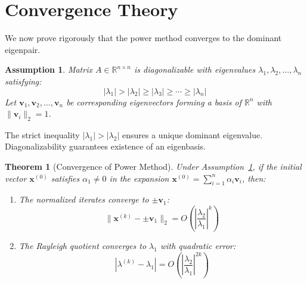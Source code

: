 \documentclass[11pt,a4paper]{article}
\newtheorem{theorem}{Theorem}
\newtheorem{assumption}{Assumption}
\begin{document}
\section{Convergence Theory}

We now prove rigorously that the power method converges to the dominant eigenpair.

\begin{assumption}\label{ass:dominant}
Matrix $A \in \mathbb{R}^{n \times n}$ is diagonalizable with eigenvalues $\lambda_1, \lambda_2, \ldots, \lambda_n$ satisfying:
\begin{equation}
|\lambda_1| > |\lambda_2| \geq |\lambda_3| \geq \cdots \geq |\lambda_n|
\end{equation}
Let $\mathbf{v}_1, \mathbf{v}_2, \ldots, \mathbf{v}_n$ be corresponding eigenvectors forming a basis of $\mathbb{R}^n$ with $\|\mathbf{v}_i\|_2 = 1$.
\end{assumption}

The strict inequality $|\lambda_1| > |\lambda_2|$ ensures a unique dominant eigenvalue. Diagonalizability guarantees existence of an eigenbasis.

\begin{theorem}[Convergence of Power Method]\label{thm:convergence}
Under Assumption~\ref{ass:dominant}, if the initial vector $\mathbf{x}^{(0)}$ satisfies $\alpha_1 \neq 0$ in the expansion $\mathbf{x}^{(0)} = \sum_{i=1}^n \alpha_i \mathbf{v}_i$, then:
\begin{enumerate}
    \item The normalized iterates converge to $\pm\mathbf{v}_1$:
    \begin{equation}
    \|\mathbf{x}^{(k)} - \pm\mathbf{v}_1\|_2 = O\left(\left|\frac{\lambda_2}{\lambda_1}\right|^k\right)
    \end{equation}
    \item The Rayleigh quotient converges to $\lambda_1$ with quadratic error:
    \begin{equation}
    |\lambda^{(k)} - \lambda_1| = O\left(\left|\frac{\lambda_2}{\lambda_1}\right|^{2k}\right)
    \end{equation}
\end{enumerate}
\end{theorem}
\end{document}
